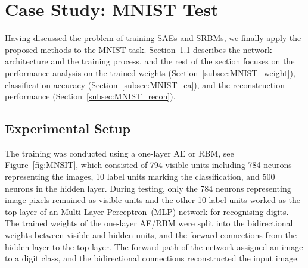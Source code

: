 

\section[Case Study]{Case Study: MNIST Test}
\label{sec:SRM_result}
Having discussed the problem of training SAEs and SRBMs, we finally apply the proposed methods to the MNIST task.
Section~\ref{subsec:MNIST_setup} describes the network architecture and the training process, and the rest of the section focuses on the performance analysis on the trained weights (Section~\ref{subsec:MNIST_weight}), classification accuracy (Section~\ref{subsec:MNIST_ca}), and the reconstruction performance (Section~\ref{subsec:MNIST_recon}).

\subsection{Experimental Setup}
\label{subsec:MNIST_setup}
The training was conducted using a one-layer AE or RBM, see Figure~\ref{fig:MNSIT}, which consisted of 794 visible units including 784 neurons representing the images, 10 label units marking the classification, and 500 neurons in the hidden layer.
During testing, only the 784 neurons representing image pixels remained as visible units and the other 10 label units worked as the top layer of an Multi-Layer Perceptron~(MLP) network for recognising digits.
The trained weights of the one-layer AE/RBM were split into the bidirectional weights between visible and hidden units, and the forward connections from the hidden layer to the top layer.
The forward path of the network assigned an image to a digit class, and the bidirectional connections reconstructed the input image.

